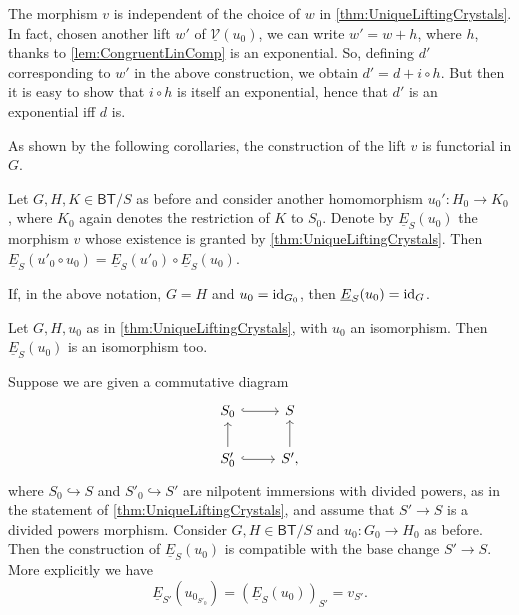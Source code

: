 \begin{rem}
	The morphism $v$ is independent of the choice of $w$
	in \cref{thm:UniqueLiftingCrystals}.
	In fact, chosen another lift $w'$ of $\underline{\mathcal{V}}(u_0)$, we 
	can write $w' = w + h$, where $h$, thanks to \cref{lem:CongruentLinComp}
	is an exponential.
	So, defining $d'$ corresponding to $w'$ in the
	above construction, we obtain $d' = d + i \circ h$.
	But then it is easy to show that $i \circ h$ is
	itself an exponential, hence that $d'$ is an
	exponential iff $d$ is.
\end{rem}


\noindent
As shown by the following corollaries, the construction of the lift \(v\)
is functorial in \(G\).
\begin{cor}\label{thm:M4.2.4.1}
	Let $G, H, K \in \mathsf{BT}/S$ as before and consider another
	homomorphism $u_0'\colon H_0 \to K_0$, where $K_0$ again denotes
	the restriction of $K$ to $S_0$.
	Denote by $\underline{E}_S(u_0)$ the morphism $v$ whose existence is granted
	by \cref{thm:UniqueLiftingCrystals}.
	Then $\underline{E}_S(u'_0 \circ u_0) = \underline{E}_S(u'_0) \circ \underline{E}_S(u_0)$.
\end{cor} 


\begin{cor}\label{thm:M4.2.4.2}
	If, in the above notation, $G = H$ and $u_0 = \operatorname{id}_{ G_0 }$,
	then $\underline{E}_S(u_0) = \operatorname{id}_{ G }$.
\end{cor} 


\begin{cor}\label{thm:M4.2.4.3}
	Let $G,H, u_0$ as in \cref{thm:UniqueLiftingCrystals},
	with $u_0$ an isomorphism.
	Then $\underline{E}_S(u_0)$ is an isomorphism too.
\end{cor} 


\begin{cor}\label{thm:M4.2.4.4}
	Suppose we are given a commutative diagram
	\begin{equation*}
	\begin{tikzcd}
		S_0 \arrow[r, "", hookrightarrow] &
		S \\
		S_0' \arrow[u, "", rightarrow] 
		\arrow[r, "", hookrightarrow] &
		S' \arrow[u, "", rightarrow] 
	,\end{tikzcd}
	\end{equation*}
	where $S_0 \hookrightarrow S$ and $S'_0 \hookrightarrow S'$ are
	nilpotent immersions with divided powers,
	as in the statement of \cref{thm:UniqueLiftingCrystals},
	and assume that $S' \to S$ is a divided powers morphism.
	Consider $G,H \in \mathsf{BT}/S$ and $u_0\colon G_0 \to H_0$ as before.
	Then the construction of $\underline{E}_S(u_0)$ is compatible with the base
	change $S' \to S$.
	More explicitly we have
	\begin{equation*}
		\underline{E}_{S'}(u_{0_{S'_0}}) =
		\left( \underline{E}_S(u_0) \right)_{S'} = v_{S'}
	.\end{equation*}
\end{cor} 



